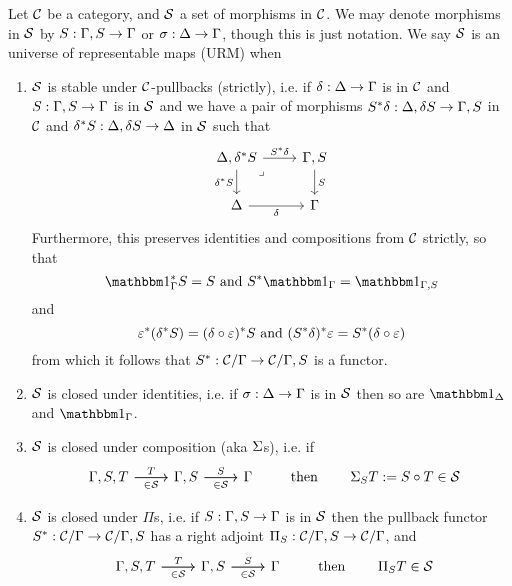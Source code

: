 \begin{dfn}
  Let $\mathcal{C}$ be a category, and $\mathcal{S}$ a set of morphisms in $\mathcal{C}$.
  We may denote morphisms in $\mathcal{S}$ by $S : \Gamma,S \to \Gamma$ or $\sigma : \Delta \to \Gamma$,
  though this is just notation.
  We say $\mathcal{S}$ is an universe of representable maps (URM) when
  \begin{enumerate}
    \item $\mathcal{S}$ is stable under $\mathcal{C}$-pullbacks (strictly),
          i.e. if $\delta : \Delta \to \Gamma$ is in $\mathcal{C}$ and $S : \Gamma,S \to \Gamma$ is in $\mathcal{S}$
          and we have a pair of morphisms $S^{*} \delta : \Delta,\delta S \to \Gamma,S$ in $\mathcal{C}$ and
          $\delta^* S : \Delta,\delta S \to \Delta$ in $\mathcal{S}$ such that
          \[\begin{tikzcd}
            {\De,\de^* S} & {\Ga,S} \\
            \De & \Ga
            \arrow["S", from=1-2, to=2-2]
            \arrow["{\de^* S}"', from=1-1, to=2-1]
            \arrow["\de"', from=2-1, to=2-2]
            \arrow["S^{*} \de", from=1-1, to=1-2]
            \arrow["\lrcorner"{anchor=center, pos=0.125}, draw=none, from=1-1, to=2-2]
          \end{tikzcd}\]
          Furthermore, this preserves identities and compositions from $\mathcal{C}$ strictly, so that
          \[ \id{\Ga}^{*} S = S \text{ and } S^{*} \id{\Ga} = \id{\Ga,S}\]
          and
          \[ \varepsilon^{*} (\delta^{*} S) = (\delta \circ \varepsilon)^{*} S \text{ and } (S^{*}\delta)^{*}\varepsilon = S^{*}(\delta \circ \varepsilon) \]
          from which it follows that
          $S^{*} : \mathcal{C} / \Gamma \to \mathcal{C} / \Gamma,S$ is a functor.
    \item $\mathcal{S}$ is closed under identities, i.e. if $\sigma : \Delta \to \Gamma$ is in $\mathcal{S}$ then
          so are $\id{\De}$ and $\id{\Ga}$.
    \item $\mathcal{S}$ is closed under composition (aka $\Sigma$s), i.e. if
          \[\begin{tikzcd}
              {\Ga,S,T} & {\Ga,S} & \Ga
              \arrow["T", from=1-1, to=1-2]
              \arrow["\in \SS"', from=1-1, to=1-2]
              \arrow["S", from=1-2, to=1-3]
              \arrow["\in \SS"', from=1-2, to=1-3]
            \end{tikzcd}
          \quad \quad \text{ then } \quad \quad \Si_{S} T := S \circ T \in \SS\]
    \item $\mathcal{S}$ is closed under $\Pi$s, i.e. if $S : \Gamma,S \to \Gamma$ is in $\mathcal{S}$
          then the pullback functor $S^{*} : \mathcal{C} / \Gamma \to \mathcal{C} / \Gamma,S$ has a right
          adjoint $\Pi_{S} : \mathcal{C} / \Gamma,S \to \mathcal{C} / \Gamma$, and
            \[\begin{tikzcd}
              {\Ga,S,T} & {\Ga,S} & \Ga
              \arrow["T", from=1-1, to=1-2]
              \arrow["\in \SS"', from=1-1, to=1-2]
              \arrow["S", from=1-2, to=1-3]
              \arrow["\in \SS"', from=1-2, to=1-3]
            \end{tikzcd}
          \quad \quad \text{ then } \quad \quad \Pi_{S} T \in \SS\]
  \end{enumerate}


\end{dfn}
